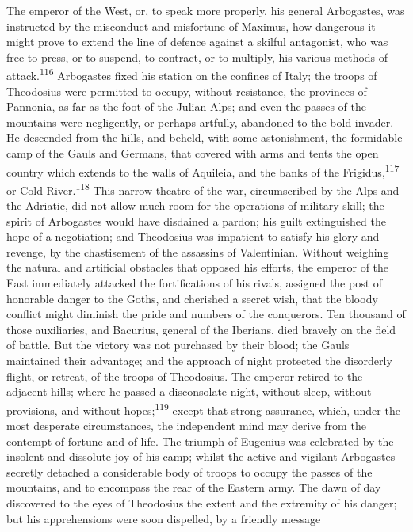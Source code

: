The emperor of the West, or, to speak more properly, his general
Arbogastes, was instructed by the misconduct and misfortune of
Maximus, how dangerous it might prove to extend the line of
defence against a skilful antagonist, who was free to press, or
to suspend, to contract, or to multiply, his various methods of
attack.\textsuperscript{116} Arbogastes fixed his station on the confines of
Italy; the troops of Theodosius were permitted to occupy, without
resistance, the provinces of Pannonia, as far as the foot of the
Julian Alps; and even the passes of the mountains were
negligently, or perhaps artfully, abandoned to the bold invader.
He descended from the hills, and beheld, with some astonishment,
the formidable camp of the Gauls and Germans, that covered with
arms and tents the open country which extends to the walls of
Aquileia, and the banks of the Frigidus,\textsuperscript{117} or Cold River.\textsuperscript{118}
This narrow theatre of the war, circumscribed by the Alps and the
Adriatic, did not allow much room for the operations of military
skill; the spirit of Arbogastes would have disdained a pardon;
his guilt extinguished the hope of a negotiation; and Theodosius
was impatient to satisfy his glory and revenge, by the
chastisement of the assassins of Valentinian. Without weighing
the natural and artificial obstacles that opposed his efforts,
the emperor of the East immediately attacked the fortifications
of his rivals, assigned the post of honorable danger to the
Goths, and cherished a secret wish, that the bloody conflict
might diminish the pride and numbers of the conquerors. Ten
thousand of those auxiliaries, and Bacurius, general of the
Iberians, died bravely on the field of battle. But the victory
was not purchased by their blood; the Gauls maintained their
advantage; and the approach of night protected the disorderly
flight, or retreat, of the troops of Theodosius. The emperor
retired to the adjacent hills; where he passed a disconsolate
night, without sleep, without provisions, and without hopes;\textsuperscript{119}
except that strong assurance, which, under the most desperate
circumstances, the independent mind may derive from the contempt
of fortune and of life. The triumph of Eugenius was celebrated by
the insolent and dissolute joy of his camp; whilst the active and
vigilant Arbogastes secretly detached a considerable body of
troops to occupy the passes of the mountains, and to encompass
the rear of the Eastern army. The dawn of day discovered to the
eyes of Theodosius the extent and the extremity of his danger;
but his apprehensions were soon dispelled, by a friendly message
